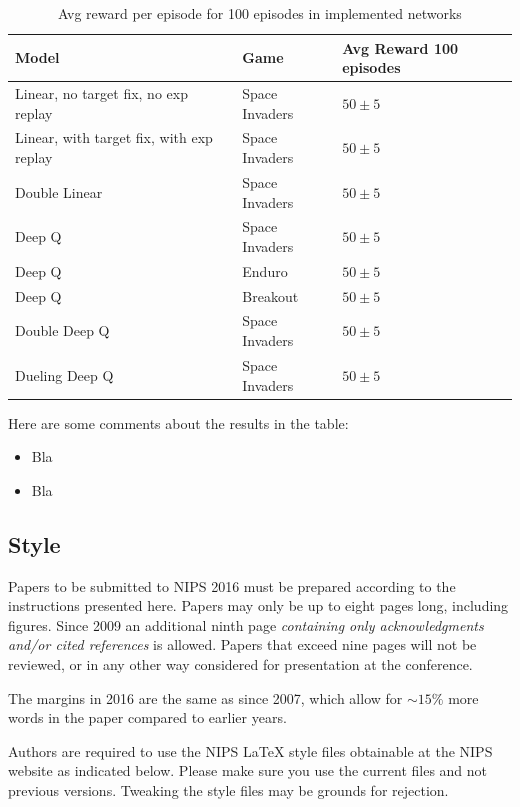 \documentclass{article}
\begin{document}
\begin{table}[h]
  \caption{Avg reward per episode for 100 episodes in implemented networks}
  \label{sample-table}
  \centering
  \begin{tabular}{lll}
    \toprule

    Model     & Game     & Avg Reward 100 episodes \\
    \midrule
    Linear, no target fix, no exp replay & Space Invaders  & $50\pm5$     \\
    Linear, with target fix, with exp replay & Space Invaders  & $50\pm5$     \\
    Double Linear & Space Invaders  & $50\pm5$     \\
    Deep Q & Space Invaders  & $50\pm5$     \\
    Deep Q & Enduro  & $50\pm5$     \\
    Deep Q & Breakout  & $50\pm5$     \\
    Double Deep Q & Space Invaders  & $50\pm5$     \\
    Dueling Deep Q & Space Invaders  & $50\pm5$     \\
    \bottomrule
  \end{tabular}
\end{table}

Here are some comments about the results in the table:
\begin{itemize}
  \item Bla
  \item Bla
\end{itemize}


\subsection{Style}

Papers to be submitted to NIPS 2016 must be prepared according to the
instructions presented here. Papers may only be up to eight pages
long, including figures. Since 2009 an additional ninth page
\emph{containing only acknowledgments and/or cited references} is
allowed. Papers that exceed nine pages will not be reviewed, or in any
other way considered for presentation at the conference.

The margins in 2016 are the same as since 2007, which allow for
$\sim$$15\%$ more words in the paper compared to earlier years.

Authors are required to use the NIPS \LaTeX{} style files obtainable
at the NIPS website as indicated below. Please make sure you use the
current files and not previous versions. Tweaking the style files may
be grounds for rejection.
\end{document}
